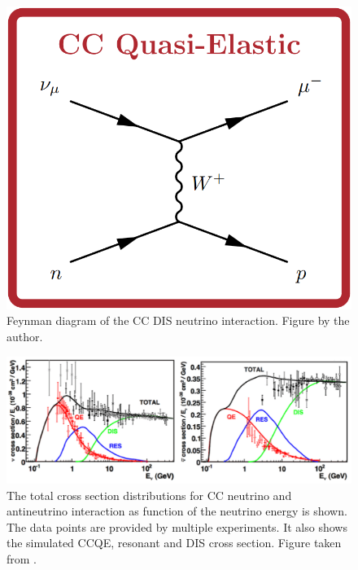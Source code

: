 \begin{itemize}
        \begin{figure}[!htb]
        \centering
        \includegraphics[scale=0.25]{Figures/Chapter1/CCQEChannel.png}
        \caption{Feynman diagram of the CC DIS neutrino interaction. Figure by the author.}
        \label{fig:Int:NuInteractions:CCDISFeynman}
    \end{figure}
\end{itemize}

\begin{figure}[!htb]
    \centering
    \includegraphics[scale=0.35]{Figures/Chapter1/InteractionChannels.png}
    \caption{The total cross section distributions for CC neutrino and antineutrino interaction as function of the neutrino energy is shown. The data points are provided by multiple experiments. It also shows the simulated CCQE, resonant and DIS cross section. Figure taken from \cite{Formaggio_2012}.}
    \label{fig:Int:NuInteractions:CCXSecChannels}
\end{figure}


